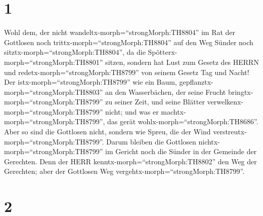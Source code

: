 \hypertarget{section}{%
\section{1}\label{section}}

 Wohl dem, der nicht wandeltx-morph=``strongMorph:TH8804''
im Rat der Gottlosen noch trittx-morph=``strongMorph:TH8804'' auf den
Weg Sünder noch sitztx-morph=``strongMorph:TH8804'', da die
Spötterx-morph=``strongMorph:TH8801'' sitzen,  sondern hat
Lust zum Gesetz des HERRN und redetx-morph=``strongMorph:TH8799'' von
seinem Gesetz Tag und Nacht!  Der
istx-morph=``strongMorph:TH8799'' wie ein Baum,
gepflanztx-morph=``strongMorph:TH8803'' an den Wasserbächen, der seine
Frucht bringtx-morph=``strongMorph:TH8799'' zu seiner Zeit, und seine
Blätter verwelkenx-morph=``strongMorph:TH8799'' nicht; und was er
machtx-morph=``strongMorph:TH8799'', das gerät
wohlx-morph=``strongMorph:TH8686''.  Aber so sind die
Gottlosen nicht, sondern wie Spreu, die der Wind
verstreutx-morph=``strongMorph:TH8799''.  Darum bleiben die
Gottlosen nichtx-morph=``strongMorph:TH8799'' im Gericht noch die Sünder
in der Gemeinde der Gerechten.  Denn der HERR
kenntx-morph=``strongMorph:TH8802'' den Weg der Gerechten; aber der
Gottlosen Weg vergehtx-morph=``strongMorph:TH8799''.

\hypertarget{section-1}{%
\section{2}\label{section-1}}

